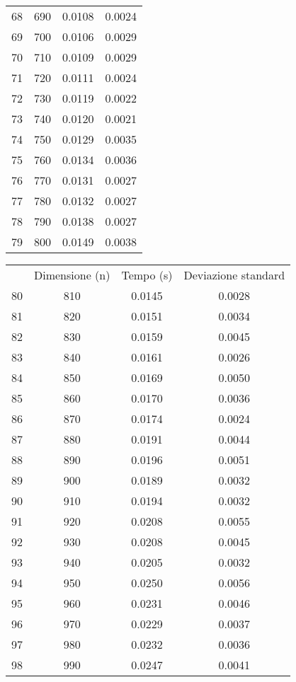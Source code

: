 \begin{table}
\begin{adjustbox}{width=1\textwidth/2}
\begin{tabular}{|c|c|c|c|}
68 & 690 & 0.0108 & 0.0024 \\
\cline{1-4}
69 & 700 & 0.0106 & 0.0029 \\
\cline{1-4}
70 & 710 & 0.0109 & 0.0029 \\
\cline{1-4}
71 & 720 & 0.0111 & 0.0024 \\
\cline{1-4}
72 & 730 & 0.0119 & 0.0022 \\
\cline{1-4}
73 & 740 & 0.0120 & 0.0021 \\
\cline{1-4}
74 & 750 & 0.0129 & 0.0035 \\
\cline{1-4}
75 & 760 & 0.0134 & 0.0036 \\
\cline{1-4}
76 & 770 & 0.0131 & 0.0027 \\
\cline{1-4}
77 & 780 & 0.0132 & 0.0027 \\
\cline{1-4}
78 & 790 & 0.0138 & 0.0027 \\
\cline{1-4}
79 & 800 & 0.0149 & 0.0038 \\
\cline{1-4}
\end{tabular}
\end{adjustbox}
\end{table}

\begin{table}
\centering
\begin{adjustbox}{width=1\textwidth/2}
\begin{tabular}{|c|c|c|c|}
\hline
 & Dimensione (n) & Tempo (s) & Deviazione standard \\
80 & 810 & 0.0145 & 0.0028 \\
\cline{1-4}
81 & 820 & 0.0151 & 0.0034 \\
\cline{1-4}
82 & 830 & 0.0159 & 0.0045 \\
\cline{1-4}
83 & 840 & 0.0161 & 0.0026 \\
\cline{1-4}
84 & 850 & 0.0169 & 0.0050 \\
\cline{1-4}
85 & 860 & 0.0170 & 0.0036 \\
\cline{1-4}
86 & 870 & 0.0174 & 0.0024 \\
\cline{1-4}
87 & 880 & 0.0191 & 0.0044 \\
\cline{1-4}
88 & 890 & 0.0196 & 0.0051 \\
\cline{1-4}
89 & 900 & 0.0189 & 0.0032 \\
\cline{1-4}
90 & 910 & 0.0194 & 0.0032 \\
\cline{1-4}
91 & 920 & 0.0208 & 0.0055 \\
\cline{1-4}
92 & 930 & 0.0208 & 0.0045 \\
\cline{1-4}
93 & 940 & 0.0205 & 0.0032 \\
\cline{1-4}
94 & 950 & 0.0250 & 0.0056 \\
\cline{1-4}
95 & 960 & 0.0231 & 0.0046 \\
\cline{1-4}
96 & 970 & 0.0229 & 0.0037 \\
\cline{1-4}
97 & 980 & 0.0232 & 0.0036 \\
\cline{1-4}
98 & 990 & 0.0247 & 0.0041 \\
\cline{1-4}
\end{tabular}
\end{adjustbox}
\end{table}

